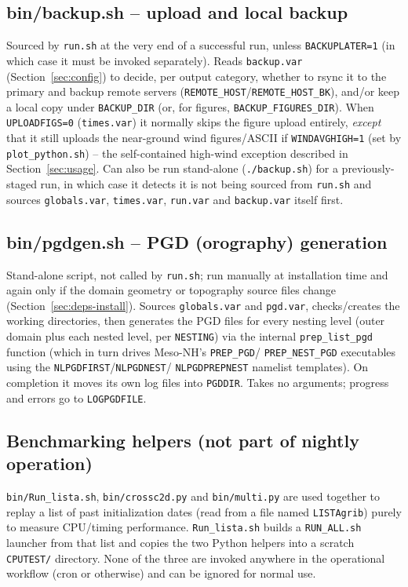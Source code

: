 \subsection{bin/backup.sh -- upload and local backup}
Sourced by \texttt{run.sh} at the very end of a successful run, unless \texttt{BACKUPLATER=1} (in which
case it must be invoked separately). Reads \texttt{backup.var} (Section~\ref{sec:config}) to decide, per
output category, whether to rsync it to the primary and backup remote servers
(\texttt{REMOTE\_HOST}\slash\texttt{REMOTE\_HOST\_BK}), and/or keep a local copy under
\texttt{BACKUP\_DIR} (or, for figures, \texttt{BACKUP\_FIGURES\_DIR}). When \texttt{UPLOADFIGS=0}
(\texttt{times.var})
it normally skips the figure upload entirely, \emph{except} that it still uploads the near-ground wind
figures/ASCII if \texttt{WINDAVGHIGH=1} (set by \texttt{plot\_python.sh}) -- the self-contained
high-wind exception described in Section~\ref{sec:usage}. Can also be run stand-alone
(\texttt{./backup.sh}) for a previously-staged run, in which case it detects it is not being sourced
from \texttt{run.sh} and sources \texttt{globals.var}, \texttt{times.var}, \texttt{run.var} and
\texttt{backup.var} itself first.

\subsection{bin/pgdgen.sh -- PGD (orography) generation}
Stand-alone script, not called by \texttt{run.sh}; run manually at installation time and again only if
the domain geometry or topography source files change (Section~\ref{sec:deps-install}). Sources
\texttt{globals.var} and \texttt{pgd.var}, checks/creates the working directories, then generates the
PGD files for every nesting level (outer domain plus each nested level, per \texttt{NESTING}) via the
internal \texttt{prep\_list\_pgd} function (which in turn drives Meso-NH's \texttt{PREP\_PGD}/
\texttt{PREP\_NEST\_PGD} executables using the \texttt{NLPGDFIRST}/\texttt{NLPGDNEST}/
\texttt{NLPGDPREPNEST} namelist templates). On completion it moves its own log files into
\texttt{PGDDIR}. Takes no arguments; progress and errors go to \texttt{LOGPGDFILE}.

\subsection{Benchmarking helpers (not part of nightly operation)}
\texttt{bin/Run\_lista.sh}, \texttt{bin/crossc2d.py} and \texttt{bin/multi.py} are used together to
replay a list of past initialization dates (read from a file named \texttt{LISTAgrib}) purely to measure
CPU/timing performance. \texttt{Run\_lista.sh} builds a \texttt{RUN\_ALL.sh} launcher from that list and
copies the two Python helpers into a scratch \texttt{CPUTEST/} directory. None of the three are invoked
anywhere in the operational workflow (cron or otherwise) and can be ignored for normal use.

